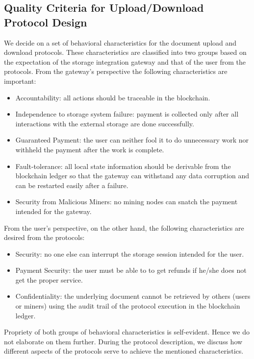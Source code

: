 \subsection{Quality Criteria for Upload/Download Protocol Design}
We decide on a set of behavioral characteristics for the document upload and download protocols. These characteristics are classified into two groups based on the expectation of the storage integration gateway and that of the user from the protocols. 
From the gateway's perspective the following characteristics are important:
\begin{itemize}
\item Accountability: all actions should be traceable in the blockchain.
\item Independence to storage system failure: payment is collected only after all interactions with the external storage are done successfully.
\item Guaranteed Payment: the user can neither fool it to do unnecessary work nor withheld the payment after the work is complete.
\item Fault-tolerance: all local state information should be derivable from the blockchain ledger so that the gateway can withstand any data corruption and can be restarted easily after a failure.  
\item Security from Malicious Miners: no mining nodes can snatch the payment intended for the gateway. 
\end{itemize}   
From the user's perspective, on the other hand, the following characteristics are desired from the protocols:
\begin{itemize}
\item Security: no one else can interrupt the storage session intended for the user. 
\item Payment Security: the user must be able to to get refunds if he/she does not get the proper service. 
\item Confidentiality: the underlying document cannot be retrieved by others (users or miners) using the audit trail of the protocol execution in the blockchain ledger.
\end{itemize} 
Propriety of both groups of behavioral characteristics is self-evident. Hence we do not elaborate on them further. During the protocol description, we discuss how different aspects of the protocols serve to achieve the mentioned characteristics. 

